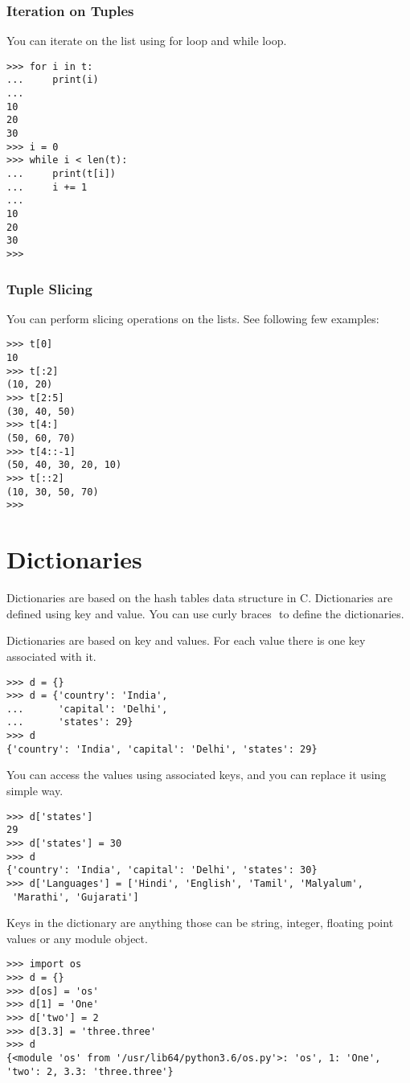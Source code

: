 \documentclass[letterpaper,12pt]{book}
\begin{document}
\subsubsection{Iteration on Tuples}
You can iterate on the list using for loop and while loop.
\begin{verbatim}
>>> for i in t:
...     print(i)
... 
10
20
30
>>> i = 0
>>> while i < len(t):
...     print(t[i])
...     i += 1
... 
10
20
30
>>> 
\end{verbatim}
\subsubsection{Tuple Slicing}
You can perform slicing operations on the lists. See following few examples:
\begin{verbatim}
>>> t[0]
10
>>> t[:2]
(10, 20)
>>> t[2:5]
(30, 40, 50)
>>> t[4:]
(50, 60, 70)
>>> t[4::-1]
(50, 40, 30, 20, 10)
>>> t[::2]
(10, 30, 50, 70)
>>> 
\end{verbatim}
\section{Dictionaries}
Dictionaries are based on the hash tables data structure in C. Dictionaries are defined using key and value. You can use curly braces ${}$ to define the dictionaries.

Dictionaries are based on key and values. For each value there is one  key associated with it. 
\begin{verbatim}
>>> d = {}
>>> d = {'country': 'India', 
...      'capital': 'Delhi', 
...      'states': 29}
>>> d
{'country': 'India', 'capital': 'Delhi', 'states': 29}
\end{verbatim}
You can access the values using associated keys, and you can replace it using simple way.
\begin{verbatim}
>>> d['states']
29
>>> d['states'] = 30
>>> d
{'country': 'India', 'capital': 'Delhi', 'states': 30}
>>> d['Languages'] = ['Hindi', 'English', 'Tamil', 'Malyalum',
 'Marathi', 'Gujarati']

\end{verbatim}
Keys in the dictionary are anything those can be string, integer, floating point values or any module object. 
\begin{verbatim}
>>> import os
>>> d = {}
>>> d[os] = 'os'
>>> d[1] = 'One'
>>> d['two'] = 2
>>> d[3.3] = 'three.three'
>>> d
{<module 'os' from '/usr/lib64/python3.6/os.py'>: 'os', 1: 'One', 'two': 2, 3.3: 'three.three'}
\end{verbatim}
\end{document}
